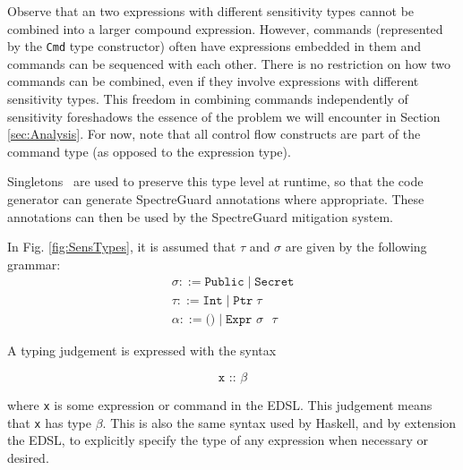 \documentclass[10pt, conference]{IEEEtran}
\newcommand{\ttt}{\texttt}
\begin{document}
Observe that an two expressions with different sensitivity types cannot be
combined into a larger compound expression. However, commands (represented by
the \verb|Cmd| type constructor) often have expressions embedded in them and
commands can be sequenced with each other.  There is no restriction on how two
commands can be combined, even if they involve expressions with different
sensitivity types. This freedom in combining commands independently of
sensitivity foreshadows the essence of the problem we will encounter in
Section \ref{sec:Analysis}. For now, note that all control flow constructs are
part of the command type (as opposed to the expression type).

Singletons~\cite{SingletonsPaper} are used to preserve this type level at runtime, so that the
code generator can generate SpectreGuard annotations where appropriate. These annotations can
then be used by the SpectreGuard mitigation system.~\cite{SpectreGuard}

In Fig. \ref{fig:SensTypes}, it is assumed that $\tau$ and $\sigma$ are given by the
following grammar:
\begin{gather*}
  \sigma ::= \ttt{Public}\;|\;\ttt{Secret}\\
  \tau ::= \ttt{Int}\;|\;\ttt{Ptr}\;\tau\\
  \alpha ::= \ttt{()}\;|\;\ttt{Expr $\sigma$ $\tau$}
\end{gather*}

\noindent A typing judgement is expressed with the syntax

\begin{equation*}
  \ttt{x :: $\beta$}
\end{equation*}

\noindent where \ttt{x} is some expression or command in the EDSL. This judgement means
that \ttt{x} has type $\beta$. This is also the same syntax used by Haskell, and by extension
the EDSL, to explicitly specify the type of any expression when necessary or desired.
\end{document}
